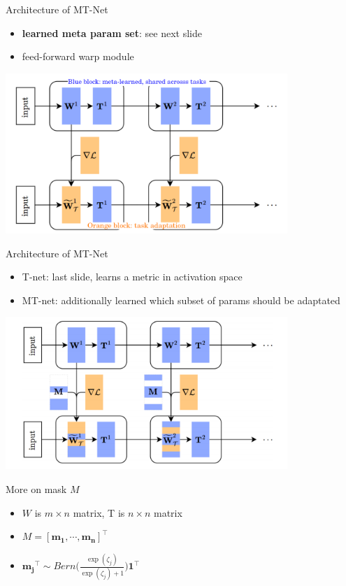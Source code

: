 \documentclass{beamer}
\begin{document}
\begin{frame}{Architecture of MT-Net}
  \begin{itemize}
    \item \textbf{learned meta param set}: see next slide
    \item feed-forward warp module
  \end{itemize}
  \center \includegraphics[width=0.8\textwidth]{fig/MT-idea.png}
\end{frame}

\begin{frame}{Architecture of MT-Net}
  \begin{itemize}
    \item T-net: last slide, learns a metric in activation space
    \item MT-net: additionally learned which subset of params should be adaptated
  \end{itemize}
  \center \includegraphics[width=0.8\textwidth]{fig/MT-idea2.png}
\end{frame}

\begin{frame}{More on mask $M$}
  \begin{itemize}
    \item $W$ is $m \times n$ matrix, T is $n \times n$ matrix
    \item $M = [\mathbf{m_1},\cdots,\mathbf{m_n}]^\top$
    \item $\mathbf{m_j}^\top \sim Bern\Big( \frac{\exp(\zeta_j)}{\exp(\zeta_j) + 1} \Big) \mathbf{1}^\top$
  \end{itemize}
\end{frame}
\end{document}
